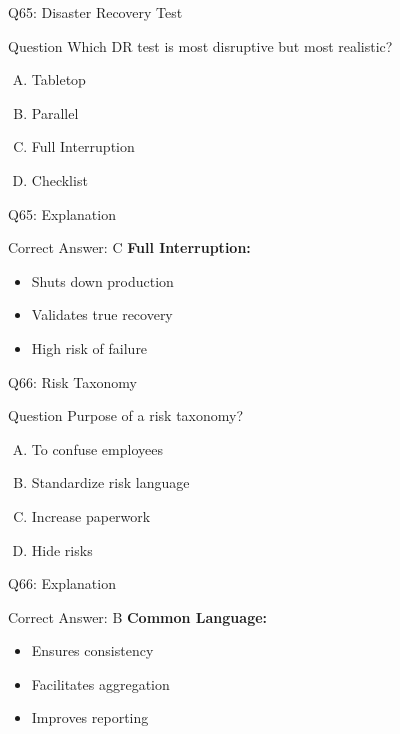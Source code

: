 \documentclass{beamer}
\begin{document}
			\begin{frame}{Q65: Disaster Recovery Test}
				\begin{block}{Question}
					Which DR test is most disruptive but most realistic?
				\end{block}
				\begin{enumerate}[(A)]
					\item Tabletop
					\item Parallel
					\item Full Interruption
					\item Checklist
				\end{enumerate}
			\end{frame}
			\begin{frame}{Q65: Explanation}
				\begin{block}{Correct Answer: C}
					\textbf{Full Interruption:}
					\begin{itemize}
						\item Shuts down production
						\item Validates true recovery
						\item High risk of failure
					\end{itemize}
				\end{block}
			\end{frame}
			
			\begin{frame}{Q66: Risk Taxonomy}
				\begin{block}{Question}
					Purpose of a risk taxonomy?
				\end{block}
				\begin{enumerate}[(A)]
					\item To confuse employees
					\item Standardize risk language
					\item Increase paperwork
					\item Hide risks
				\end{enumerate}
			\end{frame}
			\begin{frame}{Q66: Explanation}
				\begin{block}{Correct Answer: B}
					\textbf{Common Language:}
					\begin{itemize}
						\item Ensures consistency
						\item Facilitates aggregation
						\item Improves reporting
					\end{itemize}
				\end{block}
			\end{frame}
			
\end{document}
